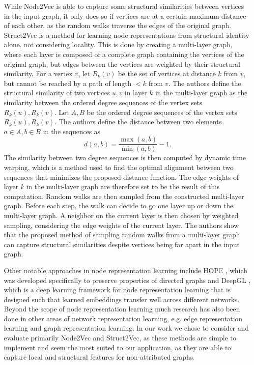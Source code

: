 \documentclass[draft,final]{vutinfth} %
\begin{document}
While Node2Vec is able to capture some structural similarities between vertices in the input graph, it only does so if vertices are at a certain maximum distance of each other, as the random walks traverse the edges of the original graph. Struct2Vec \cite{FigueiredoRS17} is a method for learning node representations from structural identity alone, not considering locality. 
This is done by creating a multi-layer graph, where each layer is composed of a complete graph containing the vertices of the original graph, but edges between the vertices are weighted by their structural similarity. 
For a vertex $v$, let $R_k(v)$ be the set of vertices at distance $k$ from $v$, but cannot be reached by a path of length $< k$ from $v$. 
The authors define the structural similarity of two vertices $u,v$ in layer $k$ in the multi-layer graph as the similarity between the ordered degree sequences of the vertex sets $R_k(u), R_k(v)$.
Let $A, B$ be the ordered degree sequences of the vertex sets $R_k(u), R_k(v)$. The authors define the distance between two elements $a \in A, b \in B$ in the sequences as 
\[
    d(a,b) = \frac{\max(a,b)}{\min(a,b) } - 1.
\]
The similarity between two degree sequences is then computed by dynamic time warping, which is a method used to find the optimal alignment between two sequences that minimizes the proposed distance function. The edge weights of layer $k$ in the multi-layer graph are therefore set to be the result of this computation. 
Random walks are then sampled from the constructed multi-layer graph. Before each step, the walk can decide to go one layer up or down the multi-layer graph. A neighbor on the current layer is then chosen by weighted sampling, considering the edge weights of the current layer. 
The authors show that the proposed method of sampling random walks from a multi-layer graph can capture structural similarities despite vertices being far apart in the input graph. 

Other notable approaches in node representation learning include HOPE \cite{Mingdong2016}, which was developed specifically to preserve properties of directed graphs and DeepGL \cite{Rossi17a}, which is a deep learning framework for node representation learning that is designed such that learned embeddings transfer well across different networks. Beyond the scope of node representation learning much research has also been done in other areas of network representation learning, e.g. edge representation learning and graph representation learning. In our work we chose to consider and evaluate primarily Node2Vec and Struct2Vec, as these methods are simple to implement and seem the most suited to our application, as they are able to capture local and structural features for non-attributed graphs. 
\end{document}
